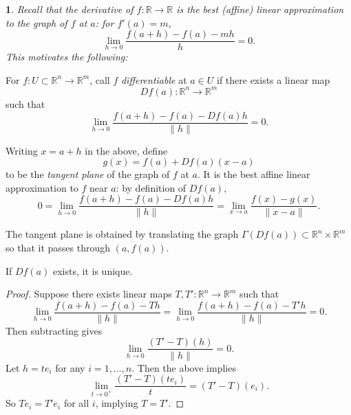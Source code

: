 \documentclass[12pt]{article}
\newtheorem{para}[theorem]{}
\begin{document}
\begin{para}
	Recall that the derivative of $f:\mathbb{R}\to\mathbb{R}$ is the best (affine) linear approximation to the graph of $f$ at $a$: for $f'(a)=m$, 
	\begin{equation*}
		\lim_{h\to 0}\frac{f(a+h)-f(a)-mh}{h} = 0.
	\end{equation*}
	This motivates the following:
\end{para}

\begin{definition}
	For $f:U\subset\mathbb{R}^n\to\mathbb{R}^m$, call $f$ \emph{differentiable} at $a\in U$ if there exists a linear map 
	\begin{equation*}
		Df(a): \mathbb{R}^n \to \mathbb{R}^m
	\end{equation*}
	such that 
	\begin{equation*}
		\lim_{h\to 0} \frac{f(a+h)-f(a)-Df(a)h}{\|h\|} = 0.
	\end{equation*}
\end{definition}

\begin{definition}
	Writing $x=a+h$ in the above, define 
	\begin{equation*}
		g(x) = f(a) + Df(a)(x-a)
	\end{equation*}
	to be the \emph{tangent plane} of the graph of $f$ at $a$. It is the best affine linear approximation to $f$ near $a$: by definition of $Df(a)$, 
	\begin{equation*}
		0 = \lim_{h\to 0}\frac{f(a+h)-f(a)-Df(a)h}{\|h\|}=\lim_{x\to a}\frac{f(x)-g(x)}{\|x-a\|}.
	\end{equation*}
\end{definition}

\begin{remark}
	The tangent plane is obtained by translating the graph $\Gamma(Df(a))\subset\mathbb{R}^n\times\mathbb{R}^m$ so that it passes through $(a, f(a))$.
\end{remark}

\begin{proposition}
	If $Df(a)$ exists, it is unique.
\end{proposition}
\begin{proof}
	Suppose there exists linear maps $T,T':\mathbb{R}^n\to\mathbb{R}^m$ such that 
	\begin{equation*}
		\lim_{h\to 0}\frac{f(a+h)-f(a)-Th}{\|h\|} = \lim_{h\to 0}\frac{f(a+h)-f(a)-T'h}{\|h\|}=0.
	\end{equation*}
	Then subtracting gives 
	\begin{equation*}
		\lim_{h\to 0}\frac{(T'-T)(h)}{\|h\|} = 0.
	\end{equation*}
	Let $h=te_i$ for any $i=1,\dots, n$. Then the above implies 
	\begin{equation*}
		\lim_{t\to 0^+}\frac{(T'-T)(te_i)}{t} = (T'-T)(e_i).
	\end{equation*}
	So $Te_i=T'e_i$ for all $i$, implying $T=T'$.
\end{proof}
\end{document}

